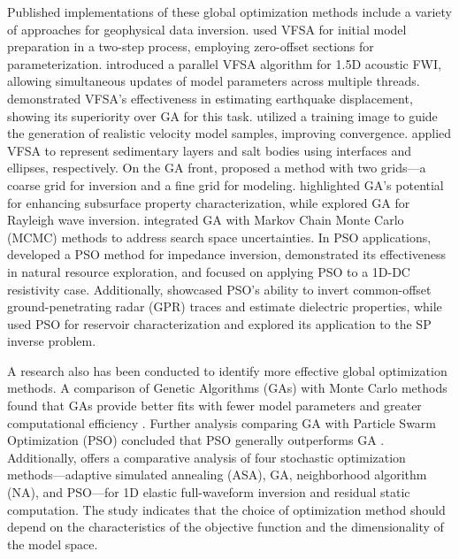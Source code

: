 \documentclass[paper,revised]{geophysics}
\begin{document}
Published implementations of these global optimization methods include a variety of approaches for geophysical data inversion. \cite{Datta2016} used VFSA for initial model preparation in a two-step process, employing zero-offset sections for parameterization. \cite{Fu2021} introduced a parallel VFSA algorithm for 1.5D acoustic FWI, allowing simultaneous updates of model parameters across multiple threads. \cite{Shiba2005} demonstrated VFSA's effectiveness in estimating earthquake displacement, showing its superiority over GA for this task. \cite{Mendes2024} utilized a training image to guide the generation of realistic velocity model samples, improving convergence. \cite{Datta2019} applied VFSA to represent sedimentary layers and salt bodies using interfaces and ellipses, respectively. On the GA front, \cite{Mazzotti2016} proposed a method with two grids—a coarse grid for inversion and a fine grid for modeling. \cite{Ktran2012} highlighted GA's potential for enhancing subsurface property characterization, while \cite{Zeng2011} explored GA for Rayleigh wave inversion. \cite{Aleardi2017} integrated GA with Markov Chain Monte Carlo (MCMC) methods to address search space uncertainties. In PSO applications, \cite{Yang2017} developed a PSO method for impedance inversion, \cite{Shaw2007} demonstrated its effectiveness in natural resource exploration, and \cite{Ding2015} focused on applying PSO to a 1D-DC resistivity case. Additionally, \cite{KaplanVural2020} showcased PSO's ability to invert common-offset ground-penetrating radar (GPR) traces and estimate dielectric properties, while \cite{Fernandez-Martinez2010} used PSO for reservoir characterization and \cite{Fern2010} explored its application to the SP inverse problem.
\par
A research also has been conducted to identify more effective global optimization methods. A comparison of Genetic Algorithms (GAs) with Monte Carlo methods found that GAs provide better fits with fewer model parameters and greater computational efficiency \citep{Sambridge1992}. Further analysis comparing GA with Particle Swarm Optimization (PSO) concluded that PSO generally outperforms GA \citep{Ding2015, Mojica2019}. Additionally, \cite{Sajeva2017} offers a comparative analysis of four stochastic optimization methods—adaptive simulated annealing (ASA), GA, neighborhood algorithm (NA), and PSO—for 1D elastic full-waveform inversion and residual static computation. The study indicates that the choice of optimization method should depend on the characteristics of the objective function and the dimensionality of the model space.
\end{document}
